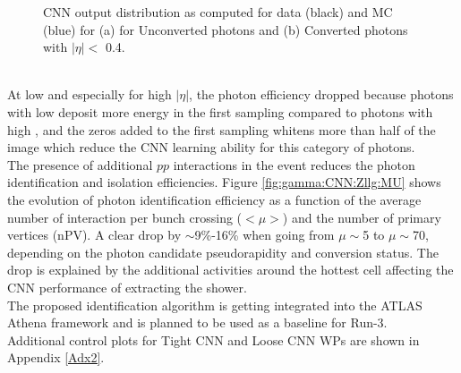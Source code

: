 \begin{figure}[htbp]
   \centering
	\begin{tcolorbox}[colback=black!5!white,colframe=white!75!black]
    \caption{CNN output distribution as computed for data (black) and MC (blue) for (a) for Unconverted photons and (b) Converted photons with $|\eta| < $ 0.4.}
    \label{fig:gamma:CNN:Zllg:CNNOutput}
    \end{tcolorbox}
    
\end{figure}
\\
At low \eT and especially for high $|\eta|$, the photon efficiency dropped because photons with low \eT deposit more energy in the first sampling compared to photons with high \eT, and the zeros added to the first sampling whitens more than half of the image which reduce the CNN learning ability for this category of photons. \\
The presence of additional $pp$ interactions in the event reduces the photon identification and isolation efficiencies. Figure \ref{fig:gamma:CNN:Zllg:MU} shows the evolution of photon identification efficiency as a function of the average number of interaction per bunch crossing ($<\mu>$) and the number of primary vertices (nPV). A clear drop by $\sim$9\%-16\% when going from $\mu\sim$5 to $\mu\sim$70, depending on the photon candidate pseudorapidity and conversion status. The drop is explained by the additional activities around the hottest cell affecting the CNN performance of extracting the shower. \\
The proposed identification algorithm is getting integrated into the ATLAS Athena framework and is planned to be used as a baseline for Run-3. \\
Additional control plots for Tight CNN and Loose CNN WPs are shown in Appendix \ref{Adx2}.

